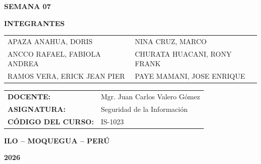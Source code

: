 \documentclass[11pt,a4paper]{article}
\begin{document}
\begin{titlepage}
\begin{center}
\vspace{0.25cm}

{\bfseries
SEMANA 07
\par}

\vspace{0.35cm}

{\bfseries\fontsize{11}{13}\selectfont
INTEGRANTES
\par}

\vspace{0.15cm}

{\fontsize{9.5}{12}\selectfont
\begin{tabular}{@{}p{7.5cm}p{7.5cm}@{}}
APAZA ANAHUA, DORIS & NINA CRUZ, MARCO \\
ANCCO RAFAEL, FABIOLA ANDREA & CHURATA HUACANI, RONY FRANK \\
RAMOS VERA, ERICK JEAN PIER & PAYE MAMANI, JOSE ENRIQUE \\
\end{tabular}
\par}

\vfill

\begin{tabular}{
    >{\bfseries}p{4.5cm}
    p{8cm}
}

DOCENTE:
&
Mgr. Juan Carlos Valero Gómez
\\[0.3cm]

ASIGNATURA:
&
Seguridad de la Información
\\[0.3cm]

CÓDIGO DEL CURSO:
&
IS-1023
\\

\end{tabular}

\vfill

{\bfseries
ILO -- MOQUEGUA -- PERÚ
\par}

\vspace{0.15cm}

{\bfseries
2026
\par}

\vspace{0.3cm}

\end{center}

\end{titlepage}


\end{document}
